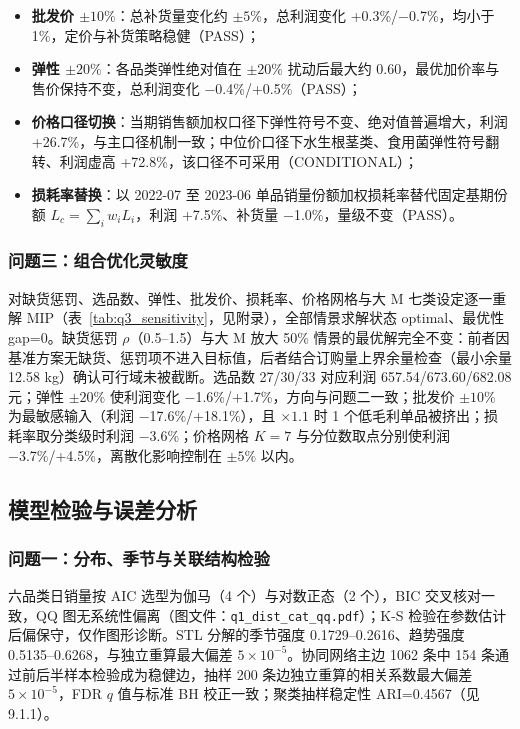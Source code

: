 \begin{itemize}
    \item \textbf{批发价 $\pm10\%$}：总补货量变化约 $\pm5\%$，总利润变化 +0.3\%/−0.7\%，均小于 1\%，定价与补货策略稳健（PASS）；
    \item \textbf{弹性 $\pm20\%$}：各品类弹性绝对值在 $\pm20\%$ 扰动后最大约 0.60，最优加价率与售价保持不变，总利润变化 −0.4\%/+0.5\%（PASS）；
    \item \textbf{价格口径切换}：当期销售额加权口径下弹性符号不变、绝对值普遍增大，利润 +26.7\%，与主口径机制一致；中位价口径下水生根茎类、食用菌弹性符号翻转、利润虚高 +72.8\%，该口径不可采用（CONDITIONAL）；
    \item \textbf{损耗率替换}：以 2022-07 至 2023-06 单品销量份额加权损耗率替代固定基期份额 $L_c=\sum_i w_i L_i$，利润 +7.5\%、补货量 −1.0\%，量级不变（PASS）。
\end{itemize}

\subsubsection{问题三：组合优化灵敏度}

对缺货惩罚、选品数、弹性、批发价、损耗率、价格网格与大 M 七类设定逐一重解 MIP（表~\ref{tab:q3_sensitivity}，见附录），全部情景求解状态 optimal、最优性 gap=0。缺货惩罚 $\rho$（0.5--1.5）与大 M 放大 50\% 情景的最优解完全不变：前者因基准方案无缺货、惩罚项不进入目标值，后者结合订购量上界余量检查（最小余量 12.58 kg）确认可行域未被截断。选品数 27/30/33 对应利润 657.54/673.60/682.08 元；弹性 $\pm20\%$ 使利润变化 −1.6\%/+1.7\%，方向与问题二一致；批发价 $\pm10\%$ 为最敏感输入（利润 −17.6\%/+18.1\%），且 $\times1.1$ 时 1 个低毛利单品被挤出；损耗率取分类级时利润 −3.6\%；价格网格 $K=7$ 与分位数取点分别使利润 −3.7\%/+4.5\%，离散化影响控制在 $\pm5\%$ 以内。

\subsection{模型检验与误差分析}

\subsubsection{问题一：分布、季节与关联结构检验}

六品类日销量按 AIC 选型为伽马（4 个）与对数正态（2 个），BIC 交叉核对一致，QQ 图无系统性偏离（图文件：\texttt{q1\_dist\_cat\_qq.pdf}）；K-S 检验在参数估计后偏保守，仅作图形诊断。STL 分解的季节强度 0.1729--0.2616、趋势强度 0.5135--0.6268，与独立重算最大偏差 $5\times10^{-5}$。协同网络主边 1062 条中 154 条通过前后半样本检验成为稳健边，抽样 200 条边独立重算的相关系数最大偏差 $5\times10^{-5}$，FDR $q$ 值与标准 BH 校正一致；聚类抽样稳定性 ARI=0.4567（见 9.1.1）。

